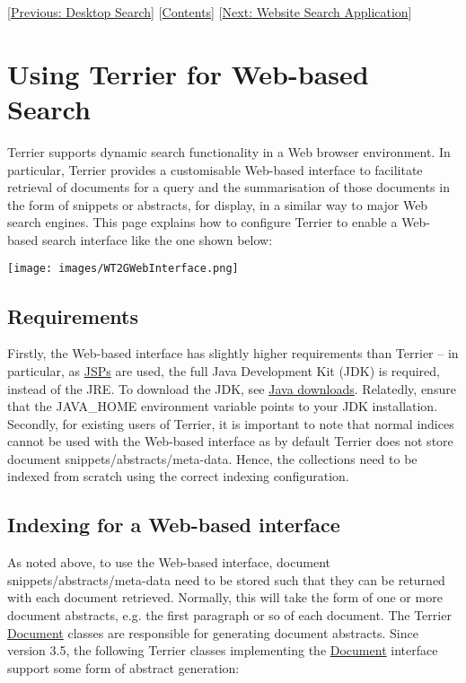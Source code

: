 {[}\href{terrier_desktop.html}{Previous: Desktop Search}{]}
{[}\href{index.html}{Contents}{]} {[}\href{website_search.html}{Next:
Website Search Application}{]}\\

\section{Using Terrier for Web-based
Search}\label{using-terrier-for-web-based-search}

Terrier supports dynamic search functionality in a Web browser
environment. In particular, Terrier provides a customisable Web-based
interface to facilitate retrieval of documents for a query and the
summarisation of those documents in the form of snippets or abstracts,
for display, in a similar way to major Web search engines. This page
explains how to configure Terrier to enable a Web-based search interface
like the one shown below:

\texttt{[image: images/WT2GWebInterface.png]}

\subsection{Requirements}\label{requirements}

Firstly, the Web-based interface has slightly higher requirements than
Terrier -- in particular, as
\href{http://en.wikipedia.org/wiki/JavaServer_Pages}{JSPs} are used, the
full Java Development Kit (JDK) is required, instead of the JRE. To
download the JDK, see
\href{http://java.sun.com/javase/downloads/index.jsp}{Java downloads}.
Relatedly, ensure that the JAVA\_HOME environment variable points to
your JDK installation. Secondly, for existing users of Terrier, it is
important to note that normal indices cannot be used with the Web-based
interface as by default Terrier does not store document
snippets/abstracts/meta-data. Hence, the collections need to be indexed
from scratch using the correct indexing configuration.

\subsection{Indexing for a Web-based
interface}\label{indexing-for-a-web-based-interface}

As noted above, to use the Web-based interface, document
snippets/abstracts/meta-data need to be stored such that they can be
returned with each document retrieved. Normally, this will take the form
of one or more document abstracts, e.g. the first paragraph or so of
each document. The Terrier
\href{javadoc/org/terrier/indexing/Document.html}{Document} classes are
responsible for generating document abstracts. Since version 3.5, the
following Terrier classes implementing the
\href{javadoc/org/terrier/indexing/Document.html}{Document} interface
support some form of abstract generation:

